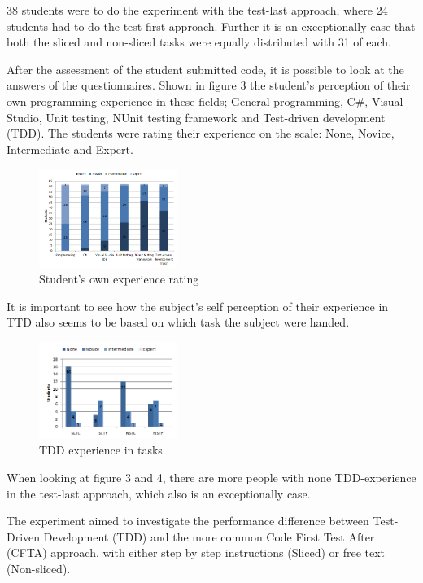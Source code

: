 \documentclass{sig-alternate-05-2015}
\begin{document}
38 students were to do the experiment with the test-last approach, where 24 students had to do the test-first approach. Further it is an exceptionally case that both the sliced and non-sliced tasks were equally distributed with 31 of each.

After the assessment of the student submitted code, it is possible to look at the answers of the questionnaires. Shown in figure 3 the student's perception of their own programming experience in these fields; General programming, C{\#}, Visual Studio, Unit testing, NUnit testing framework and Test-driven development (TDD).
The students were rating their experience on the scale: None, Novice, Intermediate and Expert.

\begin{figure}[H]
	\centering
	\includegraphics[width=0.4\textwidth]{img03}
	\caption{Student's own experience rating}
\end{figure}

It is important to see how the subject's self perception of their experience in TTD also seems to be based on which task the subject were handed.

\begin{figure}[H]
	\centering
	\includegraphics[width=0.4\textwidth]{img04}
	\caption{TDD experience in tasks}
\end{figure}

When looking at figure 3 and 4, there are more people with none TDD-experience in the test-last approach, which also is an exceptionally case.

The experiment aimed to investigate the performance difference between Test-Driven Development (TDD) and the more common Code First Test After (CFTA) approach, with either step by step instructions (Sliced) or free text (Non-sliced).\\
\end{document}
